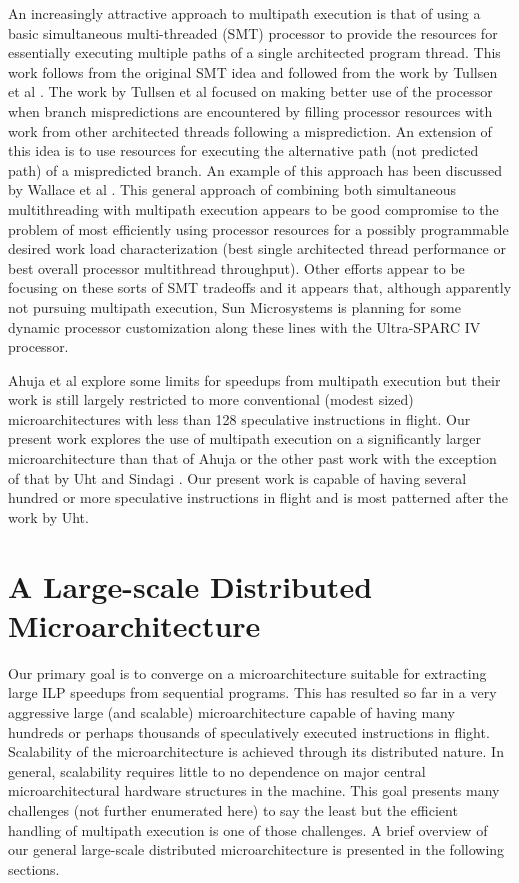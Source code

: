 \documentclass[10pt,dvips]{article}
\begin{document}
An increasingly attractive approach to multipath execution is that
of using a basic simultaneous multi-threaded (SMT) processor
to provide the resources for essentially executing multiple paths
of a single architected program thread.  This work follows from
the original SMT idea and followed from the work by
Tullsen et al \cite{Tullsen96}.  The work by Tullsen et al focused
on making better use of the processor when
branch mispredictions are encountered by filling processor resources with
work from other architected threads following a misprediction.
An extension of this idea is to use resources for executing
the alternative path (not predicted path) of a mispredicted branch.
An example of this approach has been discussed by 
Wallace et al \cite{Wallace98}.  This general approach of combining
both simultaneous multithreading with multipath execution appears
to be good compromise to the problem of most efficiently using
processor resources for a possibly programmable desired work load
characterization (best single architected thread performance or
best overall processor multithread throughput).  Other efforts
appear to be focusing on these sorts of SMT tradeoffs and
it appears that, although apparently not pursuing multipath execution, 
Sun Microsystems
is planning for some dynamic processor customization along these lines 
with the Ultra-SPARC IV processor.

Ahuja et al \cite{Ahuja98} explore some limits for speedups from
multipath execution but their work is still largely restricted to more
conventional (modest sized) microarchitectures with less than 128
speculative instructions in flight.  Our present work explores the use
of multipath execution on a significantly larger microarchitecture than
that of Ahuja or the other past work with the exception of that by
Uht and 
Sindagi \cite{Uht95}.
Our present work is capable of having several hundred or more
speculative instructions in flight and is most patterned after the
work by Uht.
%
\section{A Large-scale Distributed Microarchitecture}
%
Our primary goal is to converge on a microarchitecture suitable
for extracting large ILP speedups from sequential programs.
This has resulted so far in a very aggressive large (and scalable)
microarchitecture capable of having many hundreds or perhaps thousands
of speculatively executed instructions in flight.  Scalability
of the microarchitecture is achieved through its distributed nature.
In general, scalability requires little to no dependence on major
central microarchitectural hardware structures in the machine.
This goal presents many challenges (not further enumerated here)
to say the least but the efficient handling of multipath execution
is one of those challenges.  A brief overview of our general
large-scale distributed microarchitecture is presented in the following
sections.
%
\end{document}
